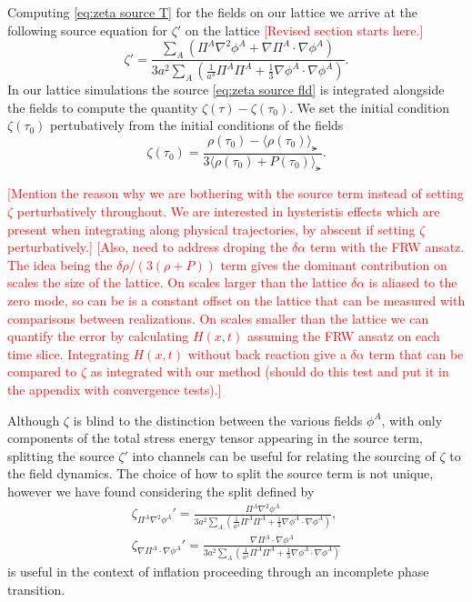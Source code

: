 Computing \eqref{eq:zeta source T} for the fields on our lattice we arrive at the following source equation for $\zeta'$ on the lattice
%
\textcolor{red}{[Revised section starts here.]}
\begin{equation} \label{eq:zeta source fld}
  \zeta' = \frac{\sum_A\left(\Pi^A\nabla^2\phi^A + \nabla\Pi^A\cdot\nabla\phi^A\right)}{3a^2\sum_A\left(\frac{1}{a^4}\Pi^A\Pi^A + \frac{1}{3}\nabla\phi^A\cdot\nabla\phi^A \right)}.
\end{equation}
In our lattice simulations the source \eqref{eq:zeta source fld} is integrated alongside the fields to compute the quantity $\zeta(\tau) - \zeta(\tau_0)$.
We set the initial condition $\zeta(\tau_0)$ pertubatively from the initial conditions of the fields
\begin{equation}
  \zeta(\tau_0) = \frac{\rho(\tau_0)-\langle\rho(\tau_0)\rangle_\lat}{3\langle\rho(\tau_0)+P(\tau_0)\rangle_\lat}.
\end{equation}

\textcolor{red}{[Mention the reason why we are bothering with the source term instead of setting $\zeta$ perturbatively throughout. We are interested in hysteristis effects which are present when integrating along physical trajectories, by abscent if setting $\zeta$ perturbatively.]}
\textcolor{red}{[Also, need to address droping the $\delta\alpha$ term with the FRW ansatz. The idea being the $\delta\rho/(3(\rho+P))$ term gives the dominant contribution on scales the size of the lattice. On scales larger than the lattice $\delta\alpha$ is aliased to the zero mode, so can be is a constant offset on the lattice that can be measured with comparisons between realizations. On scales smaller than the lattice we can quantify the error by calculating $H(x,t)$ assuming the FRW ansatz on each time slice. Integrating $H(x,t)$ without back reaction give a $\delta\alpha$ term that can be compared to $\zeta$ as integrated with our method (should do this test and put it in the appendix with convergence tests).]}

Although $\zeta$ is blind to the distinction between the various fields $\phi^A$, with only components of the total stress energy tensor appearing in the source term, splitting the source $\zeta'$ into channels can be useful for relating the sourcing of $\zeta$ to the field dynamics. The choice of how to split the source term is not unique, however we have found considering the split defined by
\begin{align}
  \zeta_{\Pi^A\nabla^2\phi^A}' = \frac{\Pi^A\nabla^2\phi^A}{3a^2\sum_A\left(\frac{1}{a^4}\Pi^A\Pi^A + \frac{1}{3}\nabla\phi^A\cdot\nabla\phi^A \right)}, \label{eq:zeta source lap}\\
  \zeta_{\nabla\Pi^A\cdot\nabla\phi^A}' = \frac{\nabla\Pi^A\cdot\nabla\phi^A}{3a^2\sum_A\left(\frac{1}{a^4}\Pi^A\Pi^A + \frac{1}{3}\nabla\phi^A\cdot\nabla\phi^A \right)} \label{eq:zeta source gdg}
\end{align}
is useful in the context of inflation proceeding through an incomplete phase transition.


